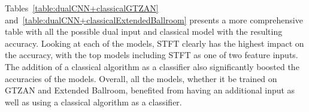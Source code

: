\documentclass[10pt,twocolumn,letterpaper]{article}
\begin{document}
	Tables~\ref{table:dualCNN+classicalGTZAN} and~\ref{table:dualCNN+classicalExtendedBallroom} presents a more comprehensive table with all the possible dual input and classical model with the resulting accuracy. Looking at each of the models, STFT clearly has the highest impact on the accuracy, with the top models including STFT as one of two feature inputs. The addition of a classical algorithm as a classifier also significantly boosted the accuracies of the models. Overall, all the models, whether it be trained on GTZAN and Extended Ballroom, benefited from having an additional input as well as using a classical algorithm as a classifier. 
	
	\begin{table}[!htbp] %
		\caption{Impacts of Dual Inputs + Classical Algorithm in GTZAN}
		\centering
		\label{table:dualCNN+classicalGTZAN}
	\end{table}
	
\end{document}
